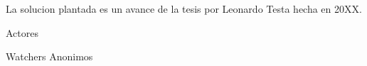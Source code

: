 La solucion plantada es un avance de la tesis por Leonardo Testa hecha en 20XX.


Actores


Watchers
Anonimos